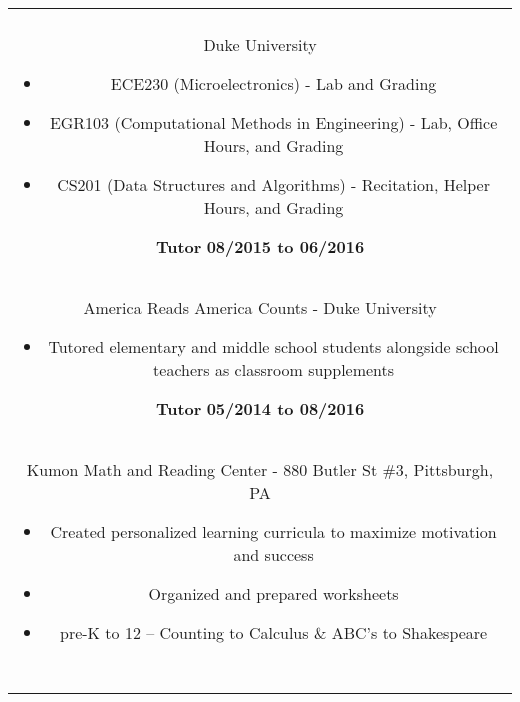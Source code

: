 \documentclass[11pt]{amsart}
\begin{document}
\begin{center}
\begin{tabular}{c}
\begin{minipage}{\textwidth}
		{\bf Teaching Assistant} \hfill {\bf 08/2016 to present}\\
		{Duke University}
		\begin{itemize}
			\item ECE230 (Microelectronics) - Lab and Grading
			\item EGR103 (Computational Methods in Engineering) - Lab, Office Hours, and Grading
			\item CS201 (Data Structures and Algorithms) - Recitation, Helper Hours, and Grading
		\end{itemize}
		
		{\bf Tutor} \hfill {\bf 08/2015 to 06/2016}\\
		{America Reads America Counts - Duke University}
		\begin{itemize}
			\item Tutored elementary and middle school students alongside school teachers as classroom supplements
		\end{itemize}
		
		{\bf Tutor} \hfill {\bf 05/2014 to 08/2016}\\
		{Kumon Math and Reading Center - 880 Butler St \#3, Pittsburgh, PA}
		\begin{itemize}
			\item Created personalized learning curricula to maximize motivation and success
			\item Organized and prepared worksheets
			\item pre-K to 12 -- Counting to Calculus \& ABC's to Shakespeare
		\end{itemize}
	\end{minipage}\\~\\
	

\end{tabular}
\end{center}
\end{document}
